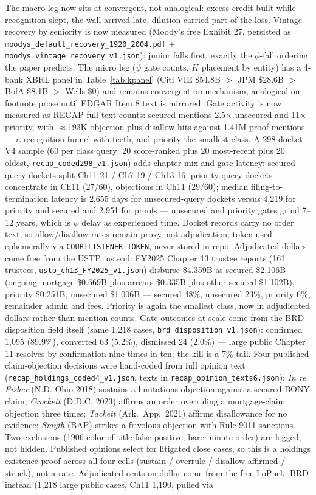 \documentclass[11pt]{article}
\begin{document}
The macro leg now sits at convergent, not analogical: excess credit built while recognition slept, the wall arrived late, dilution carried part of the loss. Vintage recovery by seniority is now measured (Moody's free Exhibit 27, persisted as \texttt{moodys\_default\_recovery\_1920\_2004.pdf} + \texttt{moodys\_vintage\_recovery\_v1.json}): junior falls first, exactly the $\phi$-fall ordering the paper predicts. The micro leg ($\psi$ gate counts, $K$ placement by entity) has a 4-bank XBRL panel in Table~\ref{tab:kpanel} (Citi VIE \$54.8B $>$ JPM \$28.6B $>$ BofA \$8.1B $>$ Wells \$0) and remains convergent on mechanism, analogical on footnote prose until EDGAR Item 8 text is mirrored. Gate activity is now measured as RECAP full-text counts: secured mentions 2.5$\times$ unsecured and 11$\times$ priority, with $\approx$193K objection-plus-disallow hits against 1.41M proof mentions --- a recognition funnel with teeth, and priority the smallest class. A 298-docket V4 sample (60 per class query: 20 score-ranked plus 20 most-recent plus 20 oldest, \texttt{recap\_coded298\_v1.json}) adds chapter mix and gate latency: secured-query dockets split Ch11 21 / Ch7 19 / Ch13 16, priority-query dockets concentrate in Ch11 (27/60), objections in Ch11 (29/60); median filing-to-termination latency is 2,655 days for unsecured-query dockets versus 4,219 for priority and secured and 2,951 for proofs --- unsecured and priority gates grind 7--12 years, which is $\psi$ delay as experienced time. Docket records carry no order text, so allow/disallow rates remain proxy, not adjudication; token used ephemerally via \texttt{COURTLISTENER\_TOKEN}, never stored in repo. Adjudicated dollars come free from the USTP instead: FY2025 Chapter 13 trustee reports (161 trustees, \texttt{ustp\_ch13\_FY2025\_v1.json}) disburse \$4.359B as secured \$2.106B (ongoing mortgage \$0.669B plus arrears \$0.335B plus other secured \$1.102B), priority \$0.251B, unsecured \$1.006B --- secured 48\%, unsecured 23\%, priority 6\%, remainder admin and fees. Priority is again the smallest class, now in adjudicated dollars rather than mention counts. Gate outcomes at scale come from the BRD disposition field itself (same 1,218 cases, \texttt{brd\_disposition\_v1.json}): confirmed 1,095 (89.9\%), converted 63 (5.2\%), dismissed 24 (2.0\%) --- large public Chapter 11 resolves by confirmation nine times in ten; the kill is a 7\% tail. Four published claim-objection decisions were hand-coded from full opinion text (\texttt{recap\_holdings\_coded4\_v1.json}, texts in \texttt{recap\_opinion\_texts6.json}): \textit{In re Fisher} (N.D. Ohio 2018) sustains a limitations objection against a secured BONY claim; \textit{Crockett} (D.D.C. 2023) affirms an order overruling a mortgage-claim objection three times; \textit{Tackett} (Ark.\ App.\ 2021) affirms disallowance for no evidence; \textit{Smyth} (BAP) strikes a frivolous objection with Rule 9011 sanctions. Two exclusions (1906 color-of-title false positive; bare minute order) are logged, not hidden. Published opinions select for litigated close cases, so this is a holdings existence proof across all four cells (sustain / overrule / disallow-affirmed / struck), not a rate. Adjudicated cents-on-dollar come from the free LoPucki BRD instead (1,218 large public cases, Ch11 1,190, pulled via 
\end{document}

